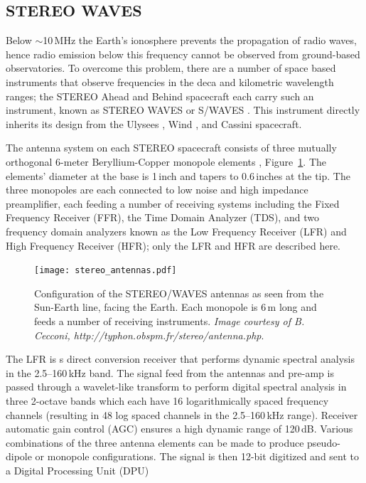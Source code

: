\subsection{STEREO WAVES}\label{sec:31}

Below $\sim$10\,MHz the Earth's ionosphere prevents the propagation of radio waves, hence radio emission below this frequency cannot be observed from ground-based observatories. To overcome this problem, there are a number of space based instruments that observe frequencies in the deca and kilometric wavelength ranges; the STEREO Ahead and Behind spacecraft each carry such an instrument, known as STEREO WAVES or S/WAVES \citep{bougeret2008}. This instrument directly inherits its design from the Ulysees \citep{stone1992}, Wind \citep{bougeret1995}, and Cassini \citep{gurnett2004} spacecraft.

The antenna system on each STEREO spacecraft consists of three mutually orthogonal 6-meter Beryllium-Copper monopole elements \citep{bale2008}, Figure~\ref{fig:swaves_antennas}. The elements' diameter at the base is 1\,inch and tapers to 0.6\,inches at the tip. The three monopoles are each connected to low noise and high impedance preamplifier, each feeding a number of receiving systems including the Fixed Frequency Receiver (FFR), the Time Domain Analyzer (TDS), and two frequency domain analyzers known as the Low Frequency Receiver (LFR) and High Frequency Receiver (HFR); only the LFR and HFR are described here.
\begin{figure}[!t]
\begin{center}
\texttt{[image: stereo\_antennas.pdf]}
\caption[The SWAVES antennas]{Configuration of the STEREO/WAVES antennas as seen from the Sun-Earth line, facing the Earth. Each monopole is 6\,m long and feeds a number of receiving instruments. \emph{Image courtesy of B. Cecconi, http://typhon.obspm.fr/stereo/antenna.php}.}
\label{fig:swaves_antennas}
\end{center}
\end{figure}

The LFR is s direct conversion receiver that performs dynamic spectral analysis in the 2.5--160\,kHz band. The signal feed from the antennas and pre-amp is passed through a wavelet-like transform to perform digital spectral analysis in three 2-octave bands which each have 16 logarithmically spaced frequency channels (resulting in 48 log spaced channels in the 2.5--160\,kHz range). Receiver automatic gain control (AGC) ensures a high dynamic range of 120\,dB. Various combinations of the three antenna elements can be made to produce pseudo-dipole or monopole configurations. The signal is then 12-bit digitized and sent to a Digital Processing Unit (DPU)

